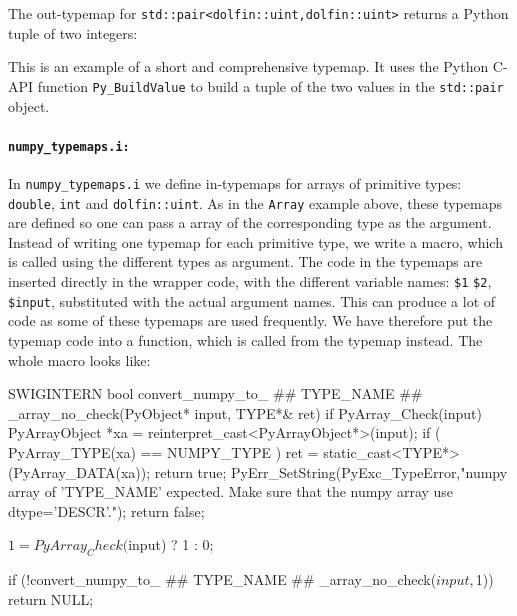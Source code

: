 The out-typemap for \texttt{std::pair}\-\texttt{<dolfin::uint,}\-\texttt{dolfin::uint>} returns a Python tuple of two integers:
This is an example of a short and comprehensive typemap. It uses the Python C-API function \texttt{Py\_BuildValue} to build a tuple of the two values in the \texttt{std::pair} object.\par

\paragraph{\texttt{numpy\_typemaps.i:}}
In \texttt{numpy\_typemaps.i} we define in-typemaps for arrays of primitive types: \texttt{double}, \texttt{int} and \texttt{dolfin::uint}. As in the \texttt{Array} example above, these typemaps are defined so one can pass a \numpy array of the corresponding type as the argument. Instead of writing one typemap for each primitive type, we write a \swig macro, which is called using the different types as argument. The code in the typemaps are inserted directly in the wrapper code, with the different variable names: \texttt{\$1} \texttt{\$2}, \texttt{\$input}, substituted with the actual argument names. This can produce a lot of code as some of these typemaps are used frequently. We have therefore put the typemap code into a function, which is called from the typemap instead. The whole macro looks like:
\begin{c++}
SWIGINTERN bool convert_numpy_to_ ## TYPE_NAME ## _array_no_check(PyObject* input, TYPE*& ret)
{
  if PyArray_Check(input)
  {
    PyArrayObject *xa = reinterpret_cast<PyArrayObject*>(input);
    if ( PyArray_TYPE(xa) == NUMPY_TYPE )
    {
      ret  = static_cast<TYPE*>(PyArray_DATA(xa));
      return true;
    }
  }
  PyErr_SetString(PyExc_TypeError,"numpy array of 'TYPE_NAME' expected. Make sure that the numpy array use dtype='DESCR'.");
  return false;
}

{
    $1 = PyArray_Check($input) ? 1 : 0;
}

{
if (!convert_numpy_to_ ## TYPE_NAME ## _array_no_check($input,$1))
    return NULL;
}

\end{c++}
